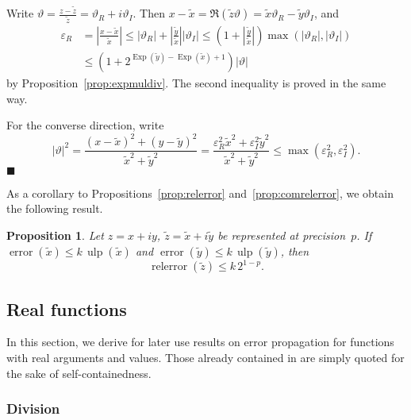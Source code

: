 \documentclass [12pt]{article}
\newcommand {\corr}[1]{{#1}}
\newcommand {\appro}[1]{\widetilde {#1}}
\newcommand {\Ulp}{{\operatorname {ulp}}}
\DeclareMathOperator{\Exp}{\operatorname {Exp}}
\newcommand{\error}{\operatorname {error}}
\newcommand{\relerror}{\operatorname {relerror}}
\renewcommand {\epsilon}{\varepsilon}
\renewcommand {\theta}{\vartheta}
\renewcommand {\leq}{\leqslant}
\newtheorem{prop}[theorem]{Proposition}
\newenvironment{proof}{\noindent{\bf Proof:}}{{\hspace* {\fill}$\blacksquare$}}
\begin{document}
\begin {proof}
Write $\theta = \frac {\corr z - \appro z}{\appro z}
= \theta_R + i \theta_I$. Then
$\corr x - \appro x = \Re (\appro z \theta)
= \appro x \theta_R - \appro y \theta_I$, and
\begin {align*}
\epsilon_R
&= \left| \frac {\corr x - \appro x}{\appro x} \right|
\leq |\theta_R| + \left| \frac {\appro y}{\appro x} \right| |\theta_I|
\leq \left( 1 + \left| \frac {\appro y}{\appro x} \right| \right)
\max (|\theta_R|, |\theta_I|) \\
&\leq \left( 1 + 2^{\Exp (\appro y) - \Exp (\appro x) + 1} \right)
|\theta|
\end {align*}
by Proposition~\ref {prop:expmuldiv}. The second inequality is proved
in the same way.

For the converse direction, write
\[
|\theta|^2
= \frac {(\corr x - \appro x)^2 + (\corr y - \appro y)^2}{\appro x^2 + \appro y^2}
= \frac {\epsilon_R^2 \appro x^2 + \epsilon_I^2 \appro y^2}{\appro x^2 + \appro y^2}
\leq \max \left( \epsilon_R^2, \epsilon_I^2 \right).
\]
\end {proof}

As a corollary to Propositions~\ref {prop:relerror}
and~\ref {prop:comrelerror}, we obtain the following result.

\begin {prop}
\label {prop:comabserror}
Let $\corr z = \corr x + i \corr y$, $\appro z = \appro x + i \appro y$
be represented at precision~$p$. If
$\error (\appro x) \leq k \, \Ulp (\appro x)$ and
$\error (\appro y) \leq k \, \Ulp (\appro y)$, then
\[
\relerror (\appro z) \leq k \, 2^{1-p}.
\]
\end {prop}



\subsection {Real functions}

In this section, we derive for later use results on error propagation for
functions with real arguments and values. Those already contained in
\cite{MPFRAlgorithms} are simply quoted for the sake of self-containedness.



\subsubsection {Division}
\label {sssec:proprealdiv}
\end{document}
